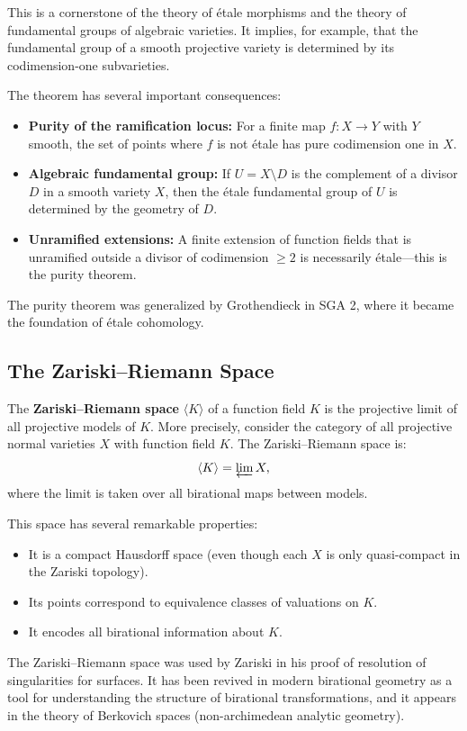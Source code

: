 This is a cornerstone of the theory of \'{e}tale morphisms and the theory of fundamental groups of algebraic varieties. It implies, for example, that the fundamental group of a smooth projective variety is determined by its codimension-one subvarieties.

The theorem has several important consequences:
\begin{itemize}
    \item \textbf{Purity of the ramification locus:} For a finite map $f: X \to Y$ with $Y$ smooth, the set of points where $f$ is not \'{e}tale has pure codimension one in $X$.
    \item \textbf{Algebraic fundamental group:} If $U = X \setminus D$ is the complement of a divisor $D$ in a smooth variety $X$, then the \'{e}tale fundamental group of $U$ is determined by the geometry of $D$.
    \item \textbf{Unramified extensions:} A finite extension of function fields that is unramified outside a divisor of codimension $\geq 2$ is necessarily \'{e}tale---this is the purity theorem.
\end{itemize}

The purity theorem was generalized by Grothendieck in SGA 2, where it became the foundation of \'{e}tale cohomology.

\subsection{The Zariski--Riemann Space}

The \textbf{Zariski--Riemann space} $\langle K \rangle$ of a function field $K$ is the projective limit of all projective models of $K$. More precisely, consider the category of all projective normal varieties $X$ with function field $K$. The Zariski--Riemann space is:
\[
\langle K \rangle = \varprojlim X,
\]
where the limit is taken over all birational maps between models.

This space has several remarkable properties:
\begin{itemize}
    \item It is a compact Hausdorff space (even though each $X$ is only quasi-compact in the Zariski topology).
    \item Its points correspond to equivalence classes of valuations on $K$.
    \item It encodes all birational information about $K$.
\end{itemize}

The Zariski--Riemann space was used by Zariski in his proof of resolution of singularities for surfaces. It has been revived in modern birational geometry as a tool for understanding the structure of birational transformations, and it appears in the theory of Berkovich spaces (non-archimedean analytic geometry).

